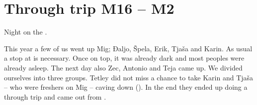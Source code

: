 \section{Through trip M16 -- M2}

\begin{marginfigure}
\checkoddpage \ifoddpage \forcerectofloat \else \forceversofloat \fi
\centering
 \caption{Night on the . }
 \label{plataeu moon}
\end{marginfigure}





This year a few of us went up Mig; Đaljo, Špela, Erik, Tjaša and Karin.
As usual a stop at  is necessary. Once on top, it was already dark
and most peoples were already asleep. The next day also Zec, Antonio
and Teja came up. We divided ourselves into three groups. Tetley did not
miss a chance to take Karin and Tjaša -- who were freshers on Mig -- caving
down  (). In the end they ended up doing a
through trip and came out from .

